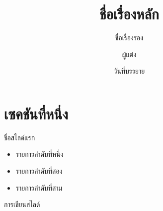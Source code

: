 \documentclass[presentation]{beamer}
\title{ชื่อเรื่องหลัก}
\subtitle{ชื่อเรื่องรอง}
\author{ผู้แต่ง}
\institute[ชื่อย่อสถาบัน] %
{
  ชื่อเต็มสถาบัน
}
\date{วันที่บรรยาย}
\begin{document}
\begin{frame}
  \titlepage
\end{frame}

\section{เซคชันที่หนึ่ง}
\begin{frame}[fragile]{ชื่อสไลด์แรก}
    \begin{itemize}
        \item รายการลำดับที่หนึ่ง
        \item รายการลำดับที่สอง
        \item รายการลำดับที่สาม
    \end{itemize}
    \vfill
    การเขียนสไลด์
\end{frame}
\end{document}
